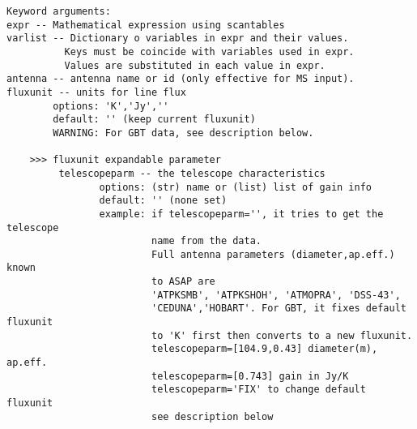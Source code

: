\begin{verbatim}
Keyword arguments:
expr -- Mathematical expression using scantables 
varlist -- Dictionary o variables in expr and their values.
          Keys must be coincide with variables used in expr.
          Values are substituted in each value in expr.
antenna -- antenna name or id (only effective for MS input).
fluxunit -- units for line flux
        options: 'K','Jy',''
        default: '' (keep current fluxunit)
        WARNING: For GBT data, see description below.
     
    >>> fluxunit expandable parameter
         telescopeparm -- the telescope characteristics
                options: (str) name or (list) list of gain info
                default: '' (none set)
                example: if telescopeparm='', it tries to get the telescope
                         name from the data.
                         Full antenna parameters (diameter,ap.eff.) known
                         to ASAP are
                         'ATPKSMB', 'ATPKSHOH', 'ATMOPRA', 'DSS-43',
                         'CEDUNA','HOBART'. For GBT, it fixes default fluxunit
                         to 'K' first then converts to a new fluxunit.
                         telescopeparm=[104.9,0.43] diameter(m), ap.eff.
                         telescopeparm=[0.743] gain in Jy/K
                         telescopeparm='FIX' to change default fluxunit
                         see description below


\end{verbatim}
